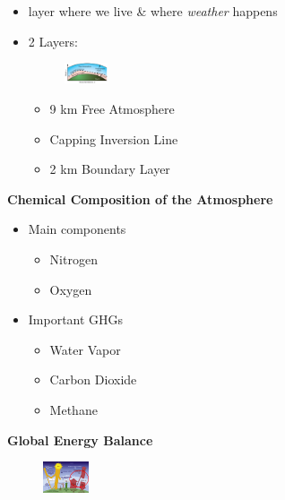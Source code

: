 \documentclass[fontsize=8pt, a4paper, landscape, fleqn]{scrartcl}
\renewcommand{\subsection}[1]{%
    \noindent\colorbox{subsectioncolor}{%
        \parbox{\dimexpr\columnwidth-2\fboxsep}{\color{white}\textbf{#1}}}%
    \vspace{0.5mm}%
}
\begin{document}
\begin{multicols*}{3}[\raggedcolumns]
\begin{itemize}
\begin{itemize}
            \item layer where we live \& where \textit{weather} happens
            \item 2 Layers: 
            \begin{figure}
                \centering
                \includegraphics[width=0.12\textwidth]{Secondary/img/Pasted image 20250407155223.png}
            \end{figure}
                \begin{itemize}
                    \item 9 km Free Atmosphere
                    \item Capping Inversion Line
                    \item 2 km Boundary Layer
                \end{itemize}
        \end{itemize}
\end{itemize}

\subsection{Chemical Composition of the Atmosphere}
\begin{itemize}
    \item Main components
        \begin{itemize}
            \item Nitrogen
            \item Oxygen
        \end{itemize}
    \item Important GHGs
        \begin{itemize}
            \item Water Vapor
            \item Carbon Dioxide
            \item Methane
        \end{itemize}
\end{itemize}

\subsection{Global Energy Balance}
\begin{figure}
    \centering
    \includegraphics[width=0.12\textwidth]{Secondary/img/Pasted image 20250407170624.png}
\end{figure}


\end{multicols*}
\end{document}
